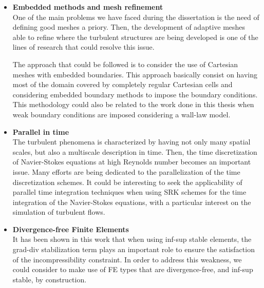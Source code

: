 \begin{itemize}
\item {\bf Embedded methods and mesh refinement}\\
One of the main problems we have faced during the dissertation is the need of defining good meshes a priory. Then, the development of adaptive meshes able to refine where the turbulent structures are being developed is one of the lines of research that could resolve this issue.

The approach that could be followed is to consider the use of Cartesian meshes with embedded boundaries. This approach basically consist on having most of the domain covered by completely regular Cartesian cells and considering embedded boundary methods to impose the boundary conditions. This methodology could also be related to the work done in this thesis when weak boundary conditions are imposed considering a wall-law model.

\item {\bf Parallel in time}\\
The turbulent phenomena is characterized by having not only many spatial scales, but also a multiscale description in time. Then, the time discretization of Navier-Stokes equations at high Reynolds number becomes an important issue. Many efforts are being dedicated to the parallelization of the time discretization schemes. It could be interesting to seek the applicability of parallel time integration techniques when using SRK schemes for the time integration of the Navier-Stokes equations, with a particular interest on the simulation of turbulent flows.

\item {\bf Divergence-free Finite Elements}\\
It has been shown in this work that when using inf-sup stable elements, the grad-div stabilization term plays an important role to ensure the satisfaction of the incompressibility constraint. In order to address this weakness, we could consider to make use of FE types that are divergence-free, and inf-sup stable, by construction.

\end{itemize}
